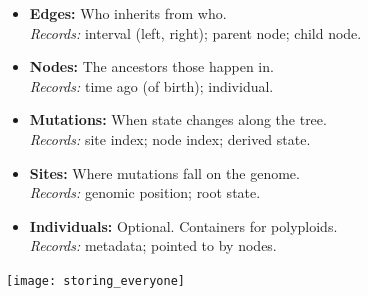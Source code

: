 \documentclass[fontscale=0.38,a0paper]{baposter}
\begin{document}
\begin{poster}
{    %

    \begin{itemize}

        \item \textbf{Edges:}   Who inherits from who. \\
            \emph{Records:} interval (left, right); parent node; child node.

        \item \textbf{Nodes:}   The ancestors those happen in. \\
            \emph{Records:} time ago (of birth); individual.

        \item \textbf{Mutations:}   When state changes along the tree. \\
            \emph{Records:} site index; node index; derived state.

        \item \textbf{Sites:}   Where mutations fall on the genome. \\
            \emph{Records:} genomic position; root state.

        \item \textbf{Individuals:} Optional. Containers for polyploids. \\
            \emph{Records:} metadata; pointed to by nodes.

    \end{itemize}

    \begin{center}
        \texttt{[image: storing\_everyone]}
    \end{center}

}


\end{poster}
\end{document}

